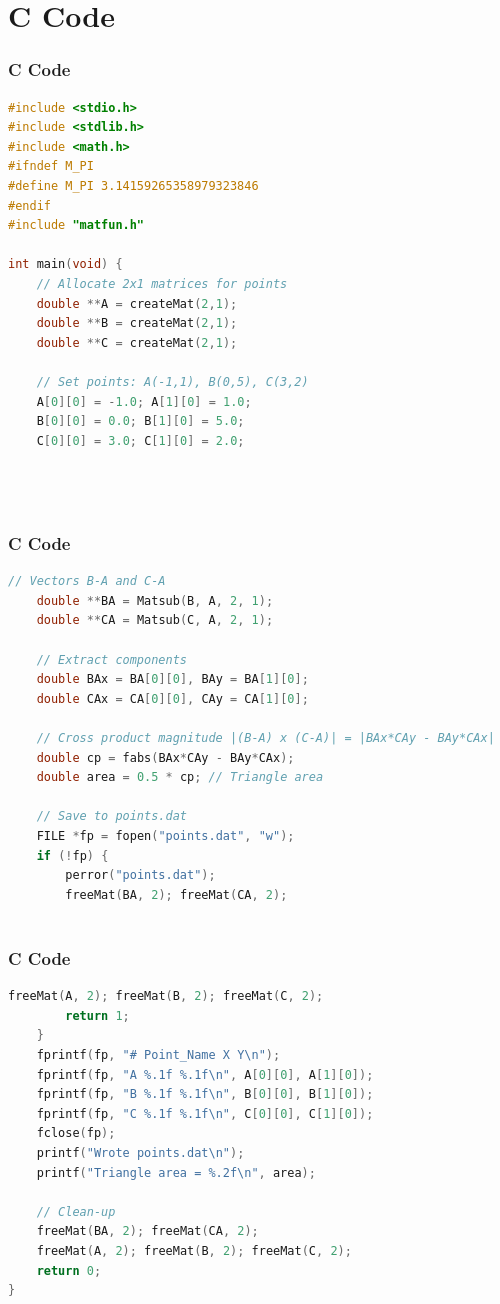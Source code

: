 \documentclass{beamer}
\theoremstyle{remark}
\numberwithin{equation}{section}
\begin{document}
\section{ C Code}
\begin{frame}[fragile]
\frametitle{C Code }
\begin{lstlisting}[language=C]
#include <stdio.h>
#include <stdlib.h>
#include <math.h>
#ifndef M_PI
#define M_PI 3.14159265358979323846
#endif
#include "matfun.h"

int main(void) {
    // Allocate 2x1 matrices for points
    double **A = createMat(2,1);
    double **B = createMat(2,1);
    double **C = createMat(2,1);

    // Set points: A(-1,1), B(0,5), C(3,2)
    A[0][0] = -1.0; A[1][0] = 1.0;
    B[0][0] = 0.0; B[1][0] = 5.0;
    C[0][0] = 3.0; C[1][0] = 2.0;

   
    
\end{lstlisting}
\end{frame}
\begin{frame}[fragile]
\frametitle{C Code }
\begin{lstlisting}[language=C]
 // Vectors B-A and C-A
    double **BA = Matsub(B, A, 2, 1);
    double **CA = Matsub(C, A, 2, 1);

    // Extract components
    double BAx = BA[0][0], BAy = BA[1][0];
    double CAx = CA[0][0], CAy = CA[1][0];

    // Cross product magnitude |(B-A) x (C-A)| = |BAx*CAy - BAy*CAx|
    double cp = fabs(BAx*CAy - BAy*CAx);
    double area = 0.5 * cp; // Triangle area

    // Save to points.dat
    FILE *fp = fopen("points.dat", "w");
    if (!fp) {
        perror("points.dat");
        freeMat(BA, 2); freeMat(CA, 2);



\end{lstlisting}
\end{frame}
\begin{frame}[fragile]
\frametitle{C Code }
\begin{lstlisting}[language=C]
        freeMat(A, 2); freeMat(B, 2); freeMat(C, 2);
        return 1;
    }
    fprintf(fp, "# Point_Name X Y\n");
    fprintf(fp, "A %.1f %.1f\n", A[0][0], A[1][0]);
    fprintf(fp, "B %.1f %.1f\n", B[0][0], B[1][0]);
    fprintf(fp, "C %.1f %.1f\n", C[0][0], C[1][0]);
    fclose(fp);
    printf("Wrote points.dat\n");
    printf("Triangle area = %.2f\n", area);

    // Clean-up
    freeMat(BA, 2); freeMat(CA, 2);
    freeMat(A, 2); freeMat(B, 2); freeMat(C, 2);
    return 0;
}

\end{lstlisting}
\end{frame}
\end{document}
